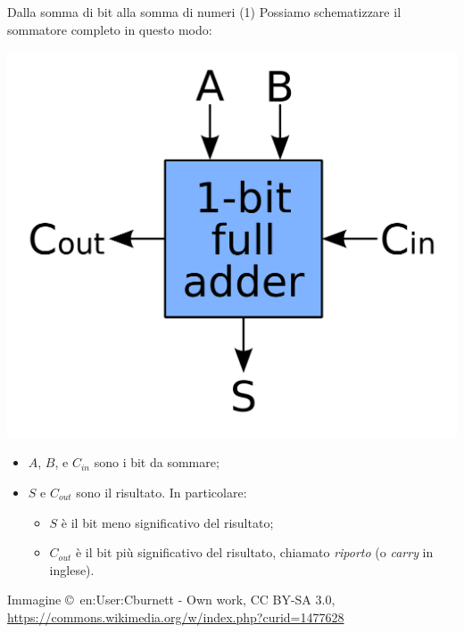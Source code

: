 \documentclass[aspectratio=169,10pt,dvipsnames,xcolor=table,handout]{beamer}
\begin{document}
\begin{frame}{Dalla somma di bit alla somma di numeri (1)}
    Possiamo schematizzare il sommatore completo in questo modo:
    \begin{center}
        \includegraphics[height=0.3\textheight]{1-bit_full-adder.png}
    \end{center}
    \begin{itemize}
        \item $A$, $B$, e $C_{in}$ sono i bit da sommare;
        \item $S$ e $C_{out}$ sono il risultato. In particolare:
        \begin{itemize}
            \item $S$ è il bit meno significativo del risultato;
            \item $C_{out}$ è il bit più significativo del risultato, chiamato \emph{riporto} (o \emph{carry} in inglese).
        \end{itemize}
    \end{itemize}
    \vfill
    {\scriptsize  Immagine \copyright\ en:User:Cburnett - Own work, CC BY-SA 3.0, \url{https://commons.wikimedia.org/w/index.php?curid=1477628}}
\end{frame}
\end{document}
